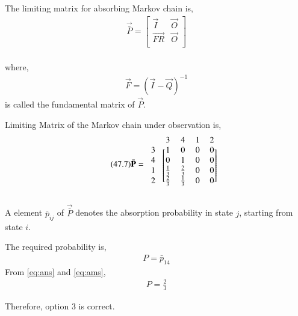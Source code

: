 \documentclass[journal,12pt,twocolumn]{IEEEtran}
\begin{document}
\begin{definition}
The limiting matrix for absorbing Markov chain is,
\begin{align}
\tag{47.5}
\label{eq:pbar}
    \vec{\bar P}=\begin{bmatrix}
    \vec{I} & \vec{O}\\
    \vec{FR} & \vec{O}\\
    \end{bmatrix}
\end{align}
\\where,
\begin{align}
\tag{47.6}
\label{eq:f}
    \vec{F}=(\vec{I}-\vec{Q})^{-1}
\end{align}
is called the fundamental matrix of $\vec{P}$. \\
\end{definition}
\begin{corollary}
Limiting Matrix of the Markov chain under observation is, 
\begin{align} 
\tag{47.7}
\label{eq:ans}
    \vec{\bar P}=\begin{blockarray}{ccccc}
&3 &4 &1 &2\\
\begin{block}{c[cccc]}
    3 & 1 & 0 & 0 & 0  \\
    4 & 0 & 1 & 0 & 0  \\
    1 & \frac{1}{3} & \frac{2}{3} & 0 & 0 \\
    2 & \frac{2}{3} & \frac{1}{3} & 0 & 0 \\
   \end{block}
\end{blockarray}
\end{align}
\end{corollary}
\begin{definition}
A element $\bar p_{ij}$ of $\vec{\bar P}$ denotes the absorption probability in state $j$, starting from state $i$.
\end{definition}
\begin{corollary}
The required probability is,
\begin{align}
\tag{47.8}
\label{eq:ams}
P =\bar p_{14}
\end{align}
From \eqref{eq:ans} and \eqref{eq:ams},
\begin{align}
\tag{47.9}
P=\frac{2}{3}
\end{align}
\end{corollary}
Therefore, option 3 is correct.\\
\end{document}
